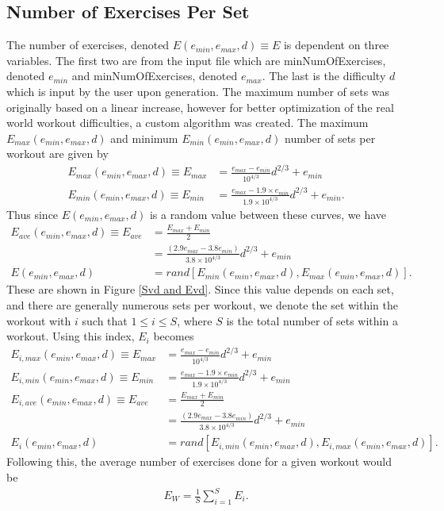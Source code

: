 \subsection{Number of Exercises Per Set}

The number of exercises, denoted $E(e_{min},e_{max},d) \equiv E$ is dependent on three variables. The first two are from the input file which are minNumOfExercises, denoted $e_{min}$ and minNumOfExercises, denoted $e_{max}$. The last is the difficulty $d$ which is input by the user upon generation. The maximum number of sets was originally based on a linear increase, however for better optimization of the real world workout difficulties, a custom algorithm was created. The maximum $E_{max}(e_{min},e_{max},d)$ and minimum $E_{min}(e_{min},e_{max},d)$ number of sets per workout are given by
\begin{align}
E_{max}(e_{min},e_{max},d) \equiv E_{max}&= \frac{e_{max}-e_{min}}{10^{4/3}} d^{2/3}+e_{min} \\
E_{min}(e_{min},e_{max},d) \equiv E_{min}&= \frac{e_{max}-1.9 \times e_{min}}{1.9 \times 10^{4/3}} d^{2/3}+e_{min}.
\end{align}
Thus since $E(e_{min},e_{max},d)$ is a random value between these curves, we have
\begin{align}
E_{ave}(e_{min},e_{max},d) \equiv E_{ave} &= \frac{E_{max}+ E_{min}}{2} \\ &= \frac{\left(2.9e_{max}-3.8e_{min}\right)}{3.8 \times 10^{4/3}}d^{2/3}+e_{min} \\
E(e_{min},e_{max},d) &= rand[E_{min}(e_{min},e_{max},d), E_{max}(e_{min},e_{max},d)].
\end{align}
These are shown in Figure \ref{Svd and Evd}. Since this value depends on each set, and there are generally numerous sets per workout, we denote the set within the workout with $i$ such that $1\leq i \leq S$, where $S$ is the total number of sets within a workout. Using this index, $E_i$ becomes
\begin{align}
	E_{i,max}(e_{min},e_{max},d) \equiv E_{max}&= \frac{e_{max}-e_{min}}{10^{4/3}} d^{2/3}+e_{min} \\
	E_{i,min}(e_{min},e_{max},d) \equiv E_{min}&= \frac{e_{max}-1.9 \times e_{min}}{1.9 \times 10^{4/3}} d^{2/3}+e_{min} \\
	E_{i,ave}(e_{min},e_{max},d) \equiv E_{ave} &= \frac{E_{max}+ E_{min}}{2} \\ &= \frac{\left(2.9e_{max}-3.8e_{min}\right)}{3.8 \times 10^{4/3}}d^{2/3}+e_{min} \\
	E_i(e_{min},e_{max},d) &= rand[E_{i,min}(e_{min},e_{max},d), E_{i,max}(e_{min},e_{max},d)].
\end{align}
Following this, the average number of exercises done for a given workout would be
\begin{align}
	E_{W} = \frac{1}{S}\sum_{i=1}^{S}E_i.
\end{align}

